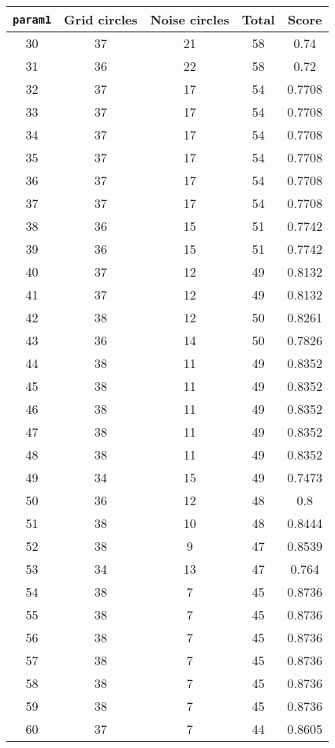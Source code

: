 \documentclass[letterpaper, 12pt]{article}
\begin{document}
\begin{longtable}{|c|c|c|c|c|}
\hline
\textbf{\texttt{param1}} & \textbf{Grid circles} & \textbf{Noise circles} & \textbf{Total} & \textbf{Score} \\
\hline
30 & 37 & 21 & 58 & 0.74 \\
\hline
31 & 36 & 22 & 58 & 0.72 \\
\hline
32 & 37 & 17 & 54 & 0.7708 \\
\hline
33 & 37 & 17 & 54 & 0.7708 \\
\hline
34 & 37 & 17 & 54 & 0.7708 \\
\hline
35 & 37 & 17 & 54 & 0.7708 \\
\hline
36 & 37 & 17 & 54 & 0.7708 \\
\hline
37 & 37 & 17 & 54 & 0.7708 \\
\hline
38 & 36 & 15 & 51 & 0.7742 \\
\hline
39 & 36 & 15 & 51 & 0.7742 \\
\hline
40 & 37 & 12 & 49 & 0.8132 \\
\hline
41 & 37 & 12 & 49 & 0.8132 \\
\hline
42 & 38 & 12 & 50 & 0.8261 \\
\hline
43 & 36 & 14 & 50 & 0.7826 \\
\hline
44 & 38 & 11 & 49 & 0.8352 \\
\hline
45 & 38 & 11 & 49 & 0.8352 \\
\hline
46 & 38 & 11 & 49 & 0.8352 \\
\hline
47 & 38 & 11 & 49 & 0.8352 \\
\hline
48 & 38 & 11 & 49 & 0.8352 \\
\hline
49 & 34 & 15 & 49 & 0.7473 \\
\hline
50 & 36 & 12 & 48 & 0.8 \\
\hline
51 & 38 & 10 & 48 & 0.8444 \\
\hline
52 & 38 & 9 & 47 & 0.8539 \\
\hline
53 & 34 & 13 & 47 & 0.764 \\
\hline
54 & 38 & 7 & 45 & 0.8736 \\
\hline
55 & 38 & 7 & 45 & 0.8736 \\
\hline
56 & 38 & 7 & 45 & 0.8736 \\
\hline
57 & 38 & 7 & 45 & 0.8736 \\
\hline
58 & 38 & 7 & 45 & 0.8736 \\
\hline
59 & 38 & 7 & 45 & 0.8736 \\
\hline
60 & 37 & 7 & 44 & 0.8605 \\

\end{longtable}
\end{document}

